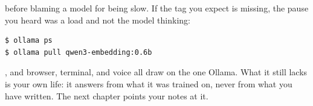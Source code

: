  before blaming a model for being slow. If
the tag you expect is missing, the pause you heard was a load and not the model
thinking:

\begin{verbatim}
$ ollama ps
$ ollama pull qwen3-embedding:0.6b
\end{verbatim}


, and browser, terminal, and voice
all draw on the one Ollama. What it still lacks is your own life: it answers
from what it was trained on, never from what you have written. The next chapter
points your notes at it.

